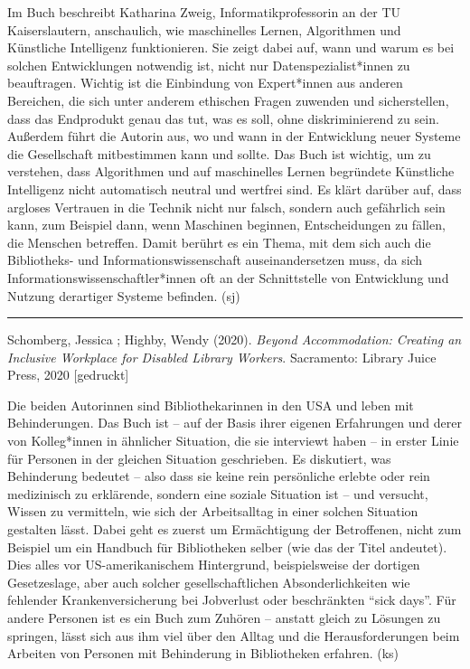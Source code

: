 \documentclass[a4paper,
fontsize=11pt,
oneside,
numbers=noperiodatend,
parskip=half-,
bibliography=totoc,
final
]{scrartcl}
\begin{document}
Im Buch beschreibt Katharina Zweig, Informatikprofessorin an der TU
Kaiserslautern, anschaulich, wie maschinelles Lernen, Algorithmen und
Künstliche Intelligenz funktionieren. Sie zeigt dabei auf, wann und
warum es bei solchen Entwicklungen notwendig ist, nicht nur
Datenspezialist*innen zu beauftragen. Wichtig ist die Einbindung von
Expert*innen aus anderen Bereichen, die sich unter anderem ethischen
Fragen zuwenden und sicherstellen, dass das Endprodukt genau das tut,
was es soll, ohne diskriminierend zu sein. Außerdem führt die Autorin
aus, wo und wann in der Entwicklung neuer Systeme die Gesellschaft
mitbestimmen kann und sollte. Das Buch ist wichtig, um zu verstehen,
dass Algorithmen und auf maschinelles Lernen begründete Künstliche
Intelligenz nicht automatisch neutral und wertfrei sind. Es klärt
darüber auf, dass argloses Vertrauen in die Technik nicht nur falsch,
sondern auch gefährlich sein kann, zum Beispiel dann, wenn Maschinen
beginnen, Entscheidungen zu fällen, die Menschen betreffen. Damit
berührt es ein Thema, mit dem sich auch die Bibliotheks- und
Informationswissenschaft auseinandersetzen muss, da sich
Informationswissenschaftler*innen oft an der Schnittstelle von
Entwicklung und Nutzung derartiger Systeme befinden. (sj)

\begin{center}\rule{0.5\linewidth}{0.5pt}\end{center}

Schomberg, Jessica ; Highby, Wendy (2020). \emph{Beyond Accommodation:
Creating an Inclusive Workplace for Disabled Library Workers}.
Sacramento: Library Juice Press, 2020 {[}gedruckt{]}

Die beiden Autorinnen sind Bibliothekarinnen in den USA und leben mit
Behinderungen. Das Buch ist -- auf der Basis ihrer eigenen Erfahrungen
und derer von Kolleg*innen in ähnlicher Situation, die sie interviewt
haben -- in erster Linie für Personen in der gleichen Situation
geschrieben. Es diskutiert, was Behinderung bedeutet -- also dass sie
keine rein persönliche erlebte oder rein medizinisch zu erklärende,
sondern eine soziale Situation ist -- und versucht, Wissen zu
vermitteln, wie sich der Arbeitsalltag in einer solchen Situation
gestalten lässt. Dabei geht es zuerst um Ermächtigung der Betroffenen,
nicht zum Beispiel um ein Handbuch für Bibliotheken selber (wie das der
Titel andeutet). Dies alles vor US-amerikanischem Hintergrund,
beispielsweise der dortigen Gesetzeslage, aber auch solcher
gesellschaftlichen Absonderlichkeiten wie fehlender Krankenversicherung
bei Jobverlust oder beschränkten \enquote{sick days}. Für andere
Personen ist es ein Buch zum Zuhören -- anstatt gleich zu Lösungen zu
springen, lässt sich aus ihm viel über den Alltag und die
Herausforderungen beim Arbeiten von Personen mit Behinderung in
Bibliotheken erfahren. (ks)
\end{document}
